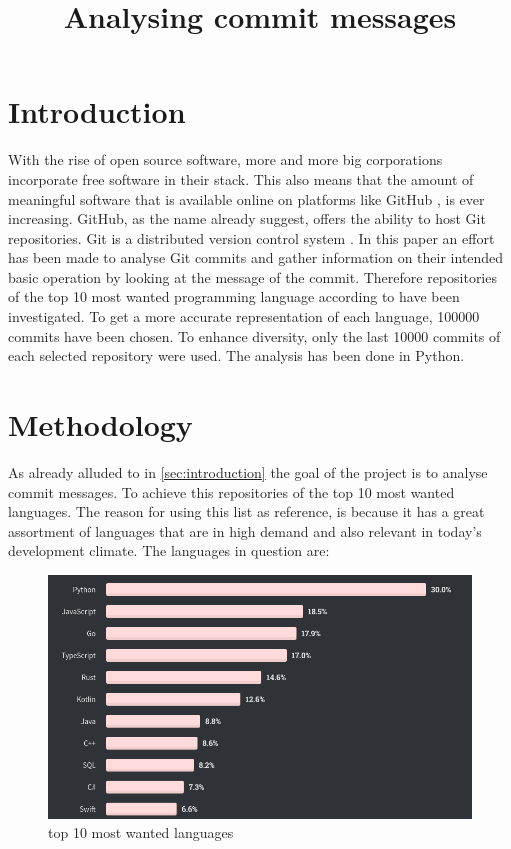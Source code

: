 \documentclass{article}
\title{Analysing commit messages}
\begin{document}
  \maketitle

  \section{Introduction}
  \label{sec:introduction}

  With the rise of open source software, more and more big corporations
  incorporate free software in their stack. This also means that the amount of
  meaningful software that is available online on platforms like GitHub
  \cite{github}, is ever increasing. GitHub, as the name already suggest,
  offers the ability to host Git repositories. Git is a distributed version
  control system \cite{git}. In this paper an effort has been made to analyse
  Git commits and gather information on their intended basic operation by
  looking at the message of the commit. Therefore
  repositories of the top 10 most wanted programming language according to
  \cite{so-survey} have been investigated. To get a more accurate
  representation of each language, 100000 commits have been chosen. To enhance
  diversity, only the last 10000 commits of each selected repository were used.
  The analysis has been done in Python.

  \section{Methodology}
  As already alluded to in \autoref{sec:introduction} the goal of the project is to
  analyse commit messages. To achieve this repositories of the top 10 most
  wanted languages. The reason for using this list as reference, is because it
  has a great assortment of languages that are in high demand and also relevant
  in today's development climate. The languages in question are:

  \begin{figure}[H]
    \centering
    \includegraphics[width=\textwidth]{wanted_languages.png}
    \caption{top 10 most wanted languages \cite{so-survey}}
    \label{fig:wanted_languages}
  \end{figure}
\end{document}
